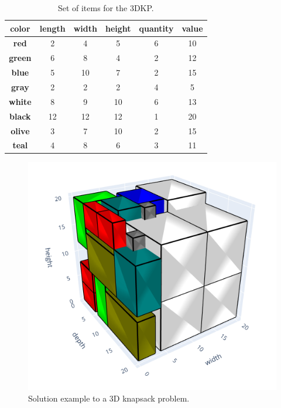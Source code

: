 \begin{table}[h]
    \centering
    \caption{Set of items for the 3DKP.}
    \label{tab:3DKP example items}
    \begin{tabular}{cccccc}
        \toprule
        \textbf{color} & \textbf{length} & \textbf{width} & \textbf{height} & \textbf{quantity} & \textbf{value}\\
        \midrule
        \textbf{red} & 2 & 4 & 5 & 6 & 10\\
        \textbf{green} & 6 & 8 & 4 & 2 & 12\\
        \textbf{blue} & 5 & 10 & 7 & 2 & 15\\
        \textbf{gray} & 2 & 2 & 2 & 4 & 5\\
        \textbf{white} & 8 & 9 & 10 & 6 & 13\\
        \textbf{black} & 12 & 12 & 12 & 1 & 20\\
        \textbf{olive} & 3 & 7 & 10 & 2 & 15\\
        \textbf{teal} & 4 & 8 & 6 & 3 & 11\\
        \bottomrule
    \end{tabular}
\end{table}

\begin{figure}[h]
    \centering
    \caption{Solution example to a 3D knapsack problem.}
    \label{fig:3DKP Egeblad solution example}
    \includegraphics[scale=0.7]{images/Egeblad3Dexample.png}
\end{figure}

